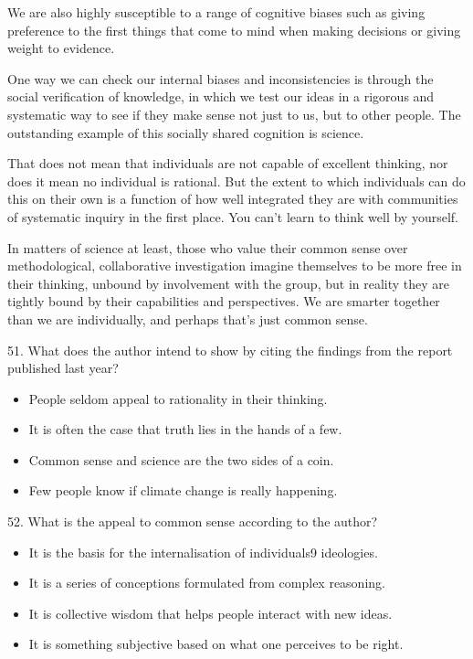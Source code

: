 \documentclass[UTF8,11pt]{ctexart}
\begin{document}
We are also highly susceptible to a range of cognitive biases such as giving preference to the first things that come to mind when making decisions or giving weight to evidence.


One way we can check our internal biases and inconsistencies is through the social verification of knowledge, in which we test our ideas in a rigorous and systematic way to see if they make sense not just to us, but to other people. The outstanding example of this socially shared cognition is science.


That does not mean that individuals are not capable of excellent thinking, nor does it mean no individual is rational. But the extent to which individuals can do this on their own is a function of how well integrated they are with communities of systematic inquiry in the first place. You can't learn to think well by yourself.


In matters of science at least, those who value their common sense over methodological, collaborative investigation imagine themselves to be more free in their thinking, unbound by involvement with the group, but in reality they are tightly bound by their capabilities and perspectives. We are smarter together than we are individually, and perhaps that's just common sense.


51. What does the author intend to show by citing the findings from the report published last year?


\begin{itemize}[leftmargin=2em,itemsep=.2em,topsep=.4em]\item[A.] People seldom appeal to rationality in their thinking.
\item[B.] It is often the case that truth lies in the hands of a few.
\item[C.] Common sense and science are the two sides of a coin.
\item[D.] Few people know if climate change is really happening.
\end{itemize}

52. What is the appeal to common sense according to the author?


\begin{itemize}[leftmargin=2em,itemsep=.2em,topsep=.4em]\item[A.] It is the basis for the internalisation of individuals9 ideologies.
\item[B.] It is a series of conceptions formulated from complex reasoning.
\item[C.] It is collective wisdom that helps people interact with new ideas.
\item[D.] It is something subjective based on what one perceives to be right.
\end{itemize}
\end{document}
